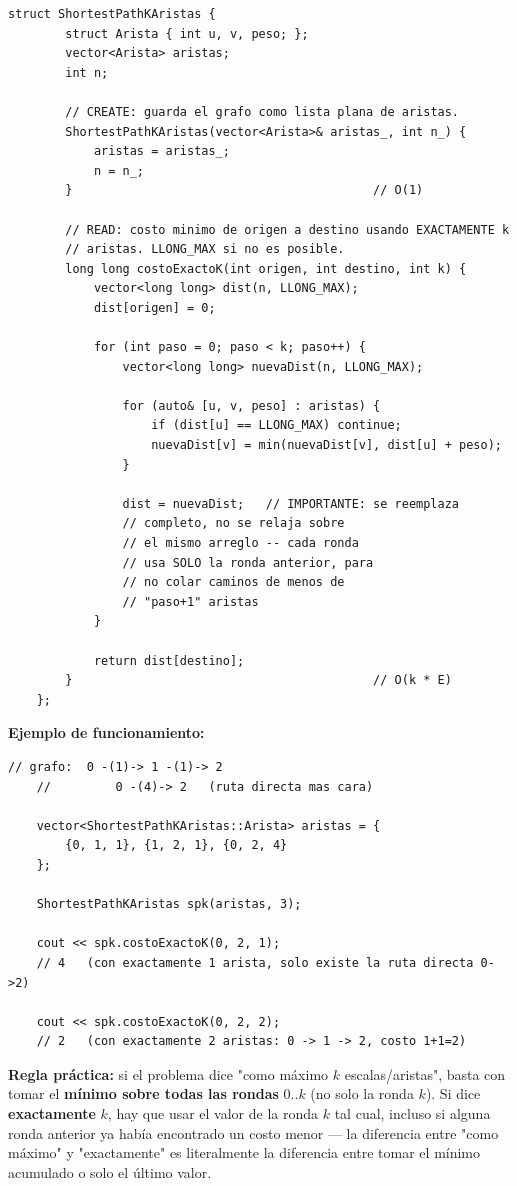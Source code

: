 \documentclass[10pt,a4paper,twocolumn]{article}
\begin{document}
\begin{lstlisting}[style=cpp]
	struct ShortestPathKAristas {
		struct Arista { int u, v, peso; };
		vector<Arista> aristas;
		int n;
		
		// CREATE: guarda el grafo como lista plana de aristas.
		ShortestPathKAristas(vector<Arista>& aristas_, int n_) {
			aristas = aristas_;
			n = n_;
		}                                          // O(1)
		
		// READ: costo minimo de origen a destino usando EXACTAMENTE k
		// aristas. LLONG_MAX si no es posible.
		long long costoExactoK(int origen, int destino, int k) {
			vector<long long> dist(n, LLONG_MAX);
			dist[origen] = 0;
			
			for (int paso = 0; paso < k; paso++) {
				vector<long long> nuevaDist(n, LLONG_MAX);
				
				for (auto& [u, v, peso] : aristas) {
					if (dist[u] == LLONG_MAX) continue;
					nuevaDist[v] = min(nuevaDist[v], dist[u] + peso);
				}
				
				dist = nuevaDist;   // IMPORTANTE: se reemplaza
				// completo, no se relaja sobre
				// el mismo arreglo -- cada ronda
				// usa SOLO la ronda anterior, para
				// no colar caminos de menos de
				// "paso+1" aristas
			}
			
			return dist[destino];
		}                                          // O(k * E)
	};
\end{lstlisting}

\textbf{Ejemplo de funcionamiento:}

\begin{lstlisting}[style=cpp]
	// grafo:  0 -(1)-> 1 -(1)-> 2
	//         0 -(4)-> 2   (ruta directa mas cara)
	
	vector<ShortestPathKAristas::Arista> aristas = {
		{0, 1, 1}, {1, 2, 1}, {0, 2, 4}
	};
	
	ShortestPathKAristas spk(aristas, 3);
	
	cout << spk.costoExactoK(0, 2, 1);
	// 4   (con exactamente 1 arista, solo existe la ruta directa 0->2)
	
	cout << spk.costoExactoK(0, 2, 2);
	// 2   (con exactamente 2 aristas: 0 -> 1 -> 2, costo 1+1=2)
\end{lstlisting}

\textbf{Regla práctica:} si el problema dice "como máximo $k$
escalas/aristas", basta con tomar el \textbf{mínimo sobre todas las
	rondas} $0..k$ (no solo la ronda $k$). Si dice \textbf{exactamente}
$k$, hay que usar el valor de la ronda $k$ tal cual, incluso si
alguna ronda anterior ya había encontrado un costo menor — la
diferencia entre "como máximo" y "exactamente" es literalmente la
diferencia entre tomar el mínimo acumulado o solo el último valor.
\end{document}
